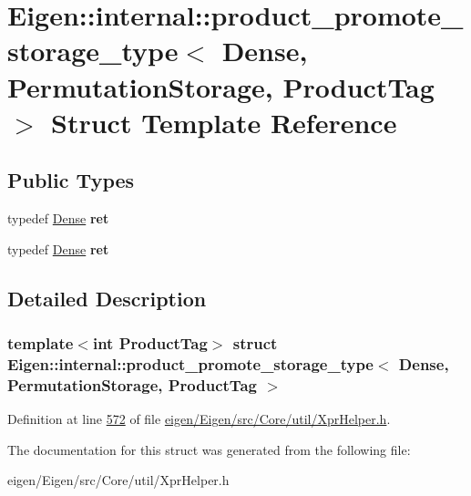 \hypertarget{struct_eigen_1_1internal_1_1product__promote__storage__type_3_01_dense_00_01_permutation_storage_00_01_product_tag_01_4}{}\section{Eigen\+:\+:internal\+:\+:product\+\_\+promote\+\_\+storage\+\_\+type$<$ Dense, Permutation\+Storage, Product\+Tag $>$ Struct Template Reference}
\label{struct_eigen_1_1internal_1_1product__promote__storage__type_3_01_dense_00_01_permutation_storage_00_01_product_tag_01_4}
\subsection*{Public Types}
\begin{DoxyCompactItemize}
\item 
\mbox{\label{struct_eigen_1_1internal_1_1product__promote__storage__type_3_01_dense_00_01_permutation_storage_00_01_product_tag_01_4_a2140e11db80fe2c1eb76d7b791d1f7de}} 
typedef \hyperlink{struct_eigen_1_1_dense}{Dense} {\bfseries ret}
\item 
\mbox{\label{struct_eigen_1_1internal_1_1product__promote__storage__type_3_01_dense_00_01_permutation_storage_00_01_product_tag_01_4_a2140e11db80fe2c1eb76d7b791d1f7de}} 
typedef \hyperlink{struct_eigen_1_1_dense}{Dense} {\bfseries ret}
\end{DoxyCompactItemize}


\subsection{Detailed Description}
\subsubsection*{template$<$int Product\+Tag$>$\newline
struct Eigen\+::internal\+::product\+\_\+promote\+\_\+storage\+\_\+type$<$ Dense, Permutation\+Storage, Product\+Tag $>$}



Definition at line \hyperlink{eigen_2_eigen_2src_2_core_2util_2_xpr_helper_8h_source_l00572}{572} of file \hyperlink{eigen_2_eigen_2src_2_core_2util_2_xpr_helper_8h_source}{eigen/\+Eigen/src/\+Core/util/\+Xpr\+Helper.\+h}.



The documentation for this struct was generated from the following file\+:\begin{DoxyCompactItemize}
\item 
eigen/\+Eigen/src/\+Core/util/\+Xpr\+Helper.\+h\end{DoxyCompactItemize}
